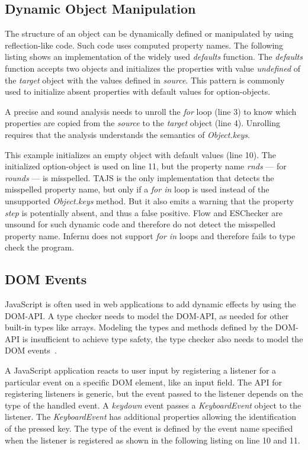 \subsection{Dynamic Object Manipulation}\label{ssec:dynamic-object-manipulation}
The structure of an object can be dynamically defined or manipulated by using reflection-like code. Such code uses computed property names. The following listing shows an implementation of the widely used \textit{defaults} function. The \textit{defaults} function accepts two objects and initializes the properties with value \textit{undefined} of the \textit{target} object with the values defined in \textit{source}. This pattern is commonly used to initialize absent properties with default values for option-objects.

A precise and sound analysis needs to unroll the \textit{for} loop (line 3) to know which properties are copied from the \textit{source} to the \textit{target} object (line 4). Unrolling requires that the analysis understands the semantics of \textit{Object.keys}. 

This example initializes an empty object with default values (line 10). The initialized option-object is used on line 11, but the property name \textit{rnds} --- for \textit{rounds} --- is misspelled. TAJS is the only implementation that detects the misspelled property name, but only if a \textit{for in} loop is used instead of the unsupported \textit{Object.keys} method. But it also emits a warning that the property \textit{step} is potentially absent, and thus a false positive. Flow and ESChecker are unsound for such dynamic code and therefore do not detect the misspelled property name. Infernu does not support \textit{for in} loops and therefore fails to type check the program.

\subsection{DOM Events}\label{ssec:dom-events}
JavaScript is often used in web applications to add dynamic effects by using the DOM-API. A type checker needs to model the DOM-API, as needed for other built-in types like arrays. Modeling the types and methods defined by the DOM-API is insufficient to achieve type safety, the type checker also needs to model the DOM events~\cite{JensenMadsenMoller2011}. 

A JavaScript application reacts to user input by registering a listener for a particular event on a specific DOM element, like an input field. The API for registering listeners is generic, but the event passed to the listener depends on the type of the handled event. A \textit{keydown} event passes a \textit{KeyboardEvent} object to the listener. The \textit{KeyboardEvent} has additional properties allowing the identification of the pressed key. The type of the event is defined by the event name specified when the listener is registered as shown in the following listing on line 10 and 11.

